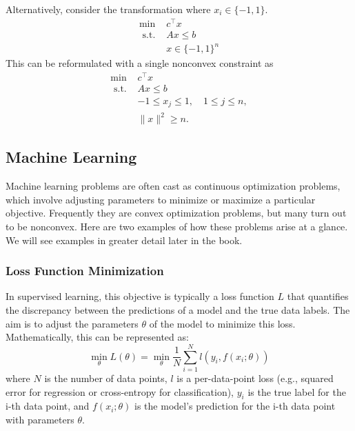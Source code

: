 Alternatively, consider the transformation where $x_i \in \{-1,1\}$.
$$
\begin{aligned}
\min & c^\top x \\
\text { s.t. } & A x \leq b \\
& x \in \{-1,1\}^n
\end{aligned}
$$
This can be reformulated with a single nonconvex constraint as
$$
\begin{array}{cl}
\min & c^\top x \\
\text { s.t. } & A x \leq b \\
& -1 \leq x_j \leq 1, \quad 1 \leq j \leq n, \\
& \|x\|^2\geq n .
\end{array}
$$


\subsection{Machine Learning}

Machine learning problems are often cast as continuous optimization problems, which involve adjusting parameters to minimize or maximize a particular objective.  Frequently they are convex optimization problems, but many turn out to be nonconvex.  Here are two examples of how these problems arise at a glance.  We will see examples in greater detail later in the book.

\subsubsection*{Loss Function Minimization}

In supervised learning, this objective is typically a loss function \( L \) that quantifies the discrepancy between the predictions of a model and the true data labels. The aim is to adjust the parameters \( \theta \) of the model to minimize this loss. Mathematically, this can be represented as:
\begin{equation}
\min_{\theta} L(\theta) = \min_{\theta} \frac{1}{N} \sum_{i=1}^{N} l(y_i, f(x_i; \theta))
\end{equation}
where \( N \) is the number of data points, \( l \) is a per-data-point loss (e.g., squared error for regression or cross-entropy for classification), \( y_i \) is the true label for the i-th data point, and \( f(x_i; \theta) \) is the model's prediction for the i-th data point with parameters \( \theta \).


